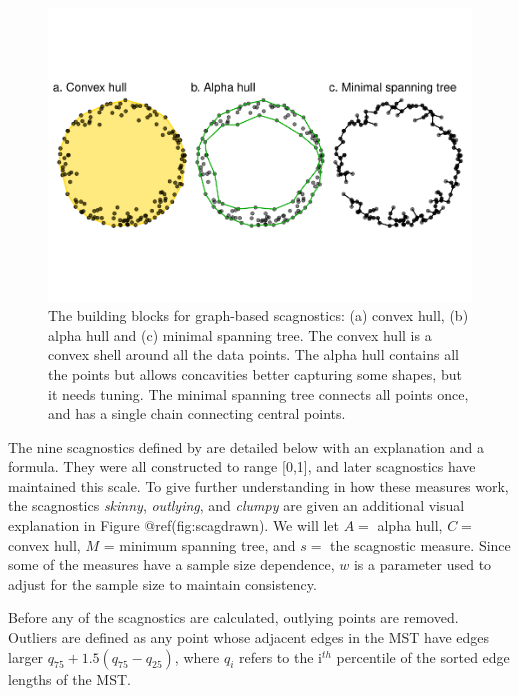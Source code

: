 \begin{Schunk}
\begin{figure}
\includegraphics[width=1\linewidth]{mason-lee-laa-cook_files/figure-latex/building-blocks2-1} \caption[The building blocks for graph-based scagnostics]{The building blocks for graph-based scagnostics: (a) convex hull, (b) alpha hull and (c) minimal spanning tree. The convex hull is a convex shell around all the data points. The alpha hull contains all the points but allows concavities better capturing some shapes, but it needs tuning. The minimal spanning tree connects all points once, and has a single chain connecting central points.}\label{fig:building-blocks2}
\end{figure}
\end{Schunk}

The nine scagnostics defined by \citet{scagdist} are detailed below with
an explanation and a formula. They were all constructed to range
{[}0,1{]}, and later scagnostics have maintained this scale. To give
further understanding in how these measures work, the scagnostics
\emph{skinny}, \emph{outlying}, and \emph{clumpy} are given an
additional visual explanation in Figure @ref(fig:scagdrawn). We will let
\(A=\) alpha hull, \(C=\) convex hull, \(M\) = minimum spanning tree,
and \(s=\) the scagnostic measure. Since some of the measures have a
sample size dependence, \(w\) is a parameter used to adjust for the
sample size to maintain consistency.

Before any of the scagnostics are calculated, outlying points are
removed. Outliers are defined as any point whose adjacent edges in the
MST have edges larger \(q_{75} + 1.5(q_{75} - q_{25})\), where \(q_i\)
refers to the i\(^{th}\) percentile of the sorted edge lengths of the
MST.

